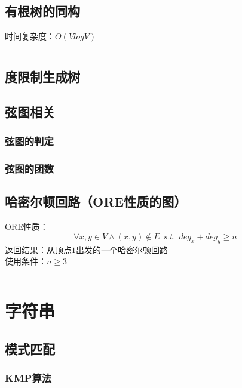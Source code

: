 \documentclass[a4paper]{article}
\newcommand{\cppcode}[1]{
    \inputminted[mathescape]{cpp}{source/#1}
}
\begin{document}
\subsection{有根树的同构}

时间复杂度：$O(V log V)$

\cppcode{graph-theory/rooted-tree-isomorphism.cpp}

\subsection{度限制生成树}

\subsection{弦图相关}

\subsubsection{弦图的判定}

\subsubsection{弦图的团数}

\subsection{哈密尔顿回路（ORE性质的图）}

ORE性质：$$\forall x,y \in V \wedge (x,y) \notin E \ \ s.t. \ \ deg_x+deg_y \geq n$$
\indent 返回结果：从顶点$1$出发的一个哈密尔顿回路\\
\indent 使用条件：$n \geq 3$

\cppcode{graph-theory/hamiltonian-circuit-ore.cpp}

\section{字符串}

\subsection{模式匹配}

\subsubsection{KMP算法}

\cppcode{string-manipulation/knuth-morris-pratt.cpp}
\end{document}

